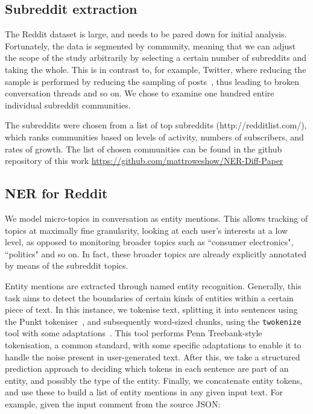 \documentclass[journal,10pt,draftclsnofoot,onecolumn]{IEEEtran}
\begin{document}
\subsection{Subreddit extraction}

The Reddit dataset is large, and needs to be pared down for initial analysis.
Fortunately, the data is segmented by community, meaning that we can adjust the scope of the study arbitrarily by selecting a certain number of subreddits and taking the whole.
This is in contrast to, for example, Twitter, where reducing the sample is performed by reducing the sampling of posts~\cite{kergl2014endogenesis}, thus leading to broken conversation threads and so on.
We chose to examine one hundred entire individual subreddit communities.

The subreddits were chosen from a list of top subreddits (http://redditlist.com/), which ranks communities based on levels of activity, numbers of subscribers, and rates of growth.
The list of chosen communities can be found in the github repository of this work \url{https://github.com/mattroweshow/NER-Diff-Paper}


\subsection{NER for Reddit}


We model micro-topics in conversation as entity mentions.
This allows tracking of topics at maximally fine granularity, looking at each user's interests at a low level, as opposed to monitoring broader topics such as ``consumer electronics", ``politics" and so on.
In fact, these broader topics are already explicitly annotated by means of the subreddit topics.

Entity mentions are extracted through named entity recognition.
Generally, this task aims to detect the boundaries of certain kinds of entities within a certain piece of text.
In this instance, we tokenise text, splitting it into sentences using the Punkt tokeniser~\cite{kiss2006unsupervised}, and subsequently word-sized chunks, using the {\tt twokenize} tool with some adaptations~\cite{o2010tweetmotif}.
This tool performs Penn Treebank-style tokenisation, a common standard, with some specific adaptations to enable it to handle the noise present in user-generated text.
After this, we take a structured prediction approach to deciding which tokens in each sentence are part of an entity, and possibly the type of the entity.
Finally, we concatenate entity tokens, and use these to build a list of entity mentions in any given input text.
For example, given the input comment from the source JSON:
\end{document}
